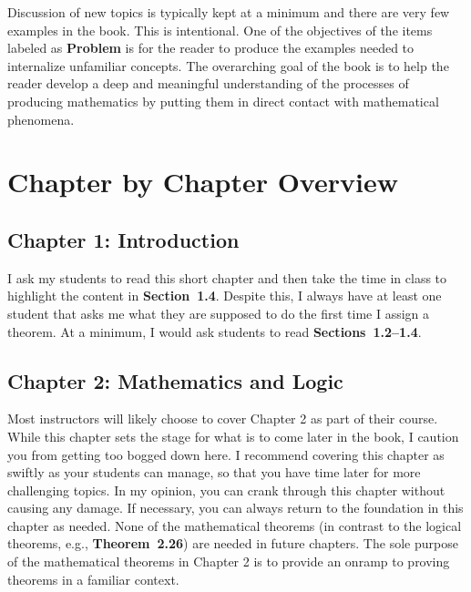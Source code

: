 \documentclass[11pt]{article}%
\newcommand{\blankline}{\pagebreak[2]\vspace{.5\baselineskip}}
\begin{document}
\blankline

Discussion of new topics is typically kept at a minimum and there are very few examples in the book. This is intentional.  One of the objectives of the items labeled as \textbf{Problem} is for the reader to produce the examples needed to internalize unfamiliar concepts.  The overarching goal of the book is to help the reader develop a deep and meaningful understanding of the processes of producing mathematics by putting them in direct contact with mathematical phenomena.


%


\section*{Chapter by Chapter Overview}

\subsection*{Chapter 1: Introduction}

I ask my students to read this short chapter and then take the time in class to highlight the content in \textbf{Section~1.4}.  Despite this, I always have at least one student that asks me what they are supposed to do the first time I assign a theorem.  At a minimum, I would ask students to read \textbf{Sections~1.2--1.4}.


\subsection*{Chapter 2: Mathematics and Logic}


Most instructors will likely choose to cover Chapter 2 as part of their course.  While this chapter sets the stage for what is to come later in the book, I caution you from getting too bogged down here.  I recommend covering this chapter as swiftly as your students can manage, so that you have time later for more challenging topics.  In my opinion, you can crank through this chapter without causing any damage. If necessary, you can always return to the foundation in this chapter as needed. None of the mathematical theorems (in contrast to the logical theorems, e.g., \textbf{Theorem~2.26}) are needed in future chapters.  The sole purpose of the mathematical theorems in Chapter 2 is to provide an onramp to proving theorems in a familiar context.
\end{document}

